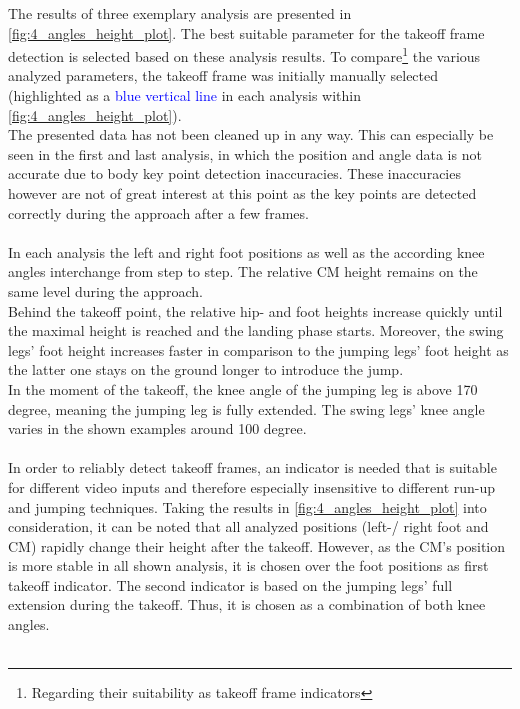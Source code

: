 The results of three exemplary analysis are presented in
\autoref{fig:4_angles_height_plot}.
The best suitable parameter for the takeoff frame detection is selected based
on these analysis results.
To compare\footnote{Regarding their suitability as takeoff frame indicators}
the various analyzed parameters, the takeoff frame was initially manually
selected (highlighted as a \textcolor{blue}{blue vertical line} in each
analysis within \autoref{fig:4_angles_height_plot}).\\
The presented data has not been cleaned up in any way.
This can especially be seen in the first and last analysis, in which the
position and angle data is not accurate due to body key point detection
inaccuracies.
These inaccuracies however are not of great interest at this point as the key
points are detected correctly during the approach after a few frames.\\\\
In each analysis the left and right foot positions as well as the
according knee angles interchange from step to step.
The relative \ac{CM} height remains on the same level during the approach.\\
Behind the takeoff point, the relative hip- and foot heights increase quickly
until the maximal height is reached and the landing phase starts.
Moreover, the swing legs' foot height increases faster in comparison to the
jumping legs' foot height as the latter one stays on the ground longer to
introduce the jump.\\
In the moment of the takeoff, the knee angle of the jumping leg is above 170
degree, meaning the jumping leg is fully extended.
The swing legs' knee angle varies in the shown examples around 100 degree.\\\\
In order to reliably detect takeoff frames, an indicator is needed that is
suitable for different video inputs and therefore especially insensitive to
different run-up and jumping techniques.  
Taking the results in \autoref{fig:4_angles_height_plot} into consideration,
it can be noted that all analyzed positions (left-/ right foot and \ac{CM})
rapidly change their height after the takeoff.
However, as the \ac{CM}'s position is more stable in all shown analysis, it is
chosen over the foot positions as first takeoff indicator.
The second indicator is based on the jumping legs' full extension during the
takeoff.
Thus, it is chosen as a combination of both knee angles.\\\\
